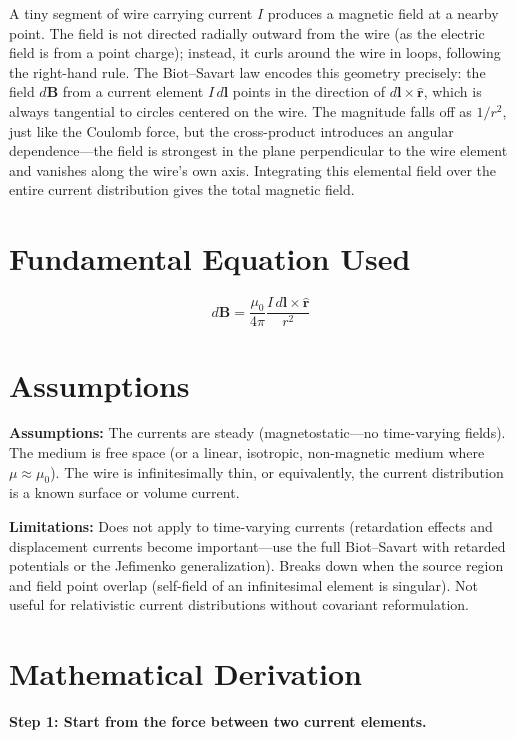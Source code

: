 \documentclass[11pt,openright]{book}
\begin{document}
A tiny segment of wire carrying current $I$ produces a magnetic field at a nearby point. The field is not directed radially outward from the wire (as the electric field is from a point charge); instead, it curls around the wire in loops, following the right-hand rule. The Biot--Savart law encodes this geometry precisely: the field $d\mathbf{B}$ from a current element $I\,d\mathbf{l}$ points in the direction of $d\mathbf{l}\times\hat{\mathbf{r}}$, which is always tangential to circles centered on the wire. The magnitude falls off as $1/r^2$, just like the Coulomb force, but the cross-product introduces an angular dependence---the field is strongest in the plane perpendicular to the wire element and vanishes along the wire's own axis. Integrating this elemental field over the entire current distribution gives the total magnetic field.
\section*{Fundamental Equation Used}

\begin{equation}
d\mathbf{B} = \frac{\mu_0}{4\pi}\frac{I\,d\mathbf{l}\times\hat{\mathbf{r}}}{r^2}
\end{equation}
\section*{Assumptions}

\textbf{Assumptions:} The currents are steady (magnetostatic---no time-varying fields). The medium is free space (or a linear, isotropic, non-magnetic medium where $\mu \approx \mu_0$). The wire is infinitesimally thin, or equivalently, the current distribution is a known surface or volume current.


\textbf{Limitations:} Does not apply to time-varying currents (retardation effects and displacement currents become important---use the full Biot--Savart with retarded potentials or the Jefimenko generalization). Breaks down when the source region and field point overlap (self-field of an infinitesimal element is singular). Not useful for relativistic current distributions without covariant reformulation.


\section*{Mathematical Derivation}

\textbf{Step 1: Start from the force between two current elements.}
\end{document}
